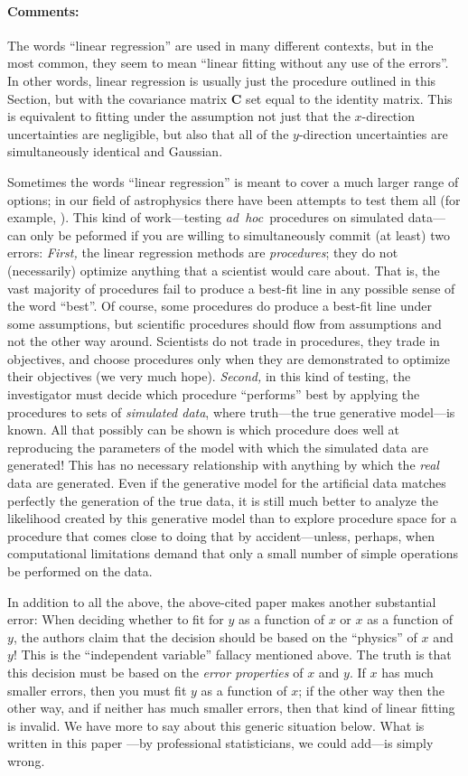 \documentclass[12pt,twoside]{article}
\newcommand{\notenglish}[1]{\textsl{#1}}
\newcommand{\adhoc}{\notenglish{ad~hoc}}
\newcommand{\sectionname}{Section}
\newcommand{\commentsname}{Comments}
\newenvironment{comments}{\paragraph{\commentsname:}}{}
\newcommand{\mmatrix}[1]{\boldsymbol{#1}}
\newcommand{\mC}{\mmatrix{C}}
\begin{document}
\begin{comments}
The words ``linear regression'' are used in many different contexts,
but in the most common, they seem to mean ``linear fitting without any
use of the errors''.  In other words, linear regression is usually
just the procedure outlined in this \sectionname, but with the
covariance matrix $\mC$ set equal to the identity matrix.  This is
equivalent to fitting under the assumption not just that the
$x$-direction uncertainties are negligible, but also that all of the
$y$-direction uncertainties are simultaneously identical and Gaussian.

Sometimes the words ``linear regression'' is meant to cover a much
larger range of options; in our field of astrophysics there have been
attempts to test them all (for example, \citealt{isobe90}).  This kind
of work---testing \adhoc\ procedures on simulated data---can only be
peformed if you are willing to simultaneously commit (at least) two
errors: \emph{First,} the linear regression methods are
\emph{procedures}; they do not (necessarily) optimize anything that a
scientist would care about. That is, the vast majority of procedures
fail to produce a best-fit line in any possible sense of the word
``best''.  Of course, some procedures do produce a best-fit line under
some assumptions, but scientific procedures should flow from
assumptions and not the other way around.  Scientists do not trade in
procedures, they trade in objectives, and choose procedures only when
they are demonstrated to optimize their objectives (we very much
hope).  \emph{Second,} in this kind of testing, the investigator must
decide which procedure ``performs'' best by applying the procedures to
sets of \emph{simulated data}, where truth---the true generative
model---is known.  All that possibly can be shown is which procedure
does well at reproducing the parameters of the model with which the
simulated data are generated!  This has no necessary relationship with
anything by which the \emph{real} data are generated.  Even if the
generative model for the artificial data matches perfectly the
generation of the true data, it is still much better to analyze the
likelihood created by this generative model than to explore procedure
space for a procedure that comes close to doing that by
accident---unless, perhaps, when computational limitations demand that
only a small number of simple operations be performed on the data.

In addition to all the above, the above-cited paper \citep{isobe90}
makes another substantial error: When deciding whether to fit for $y$
as a function of $x$ or $x$ as a function of $y$, the authors claim
that the decision should be based on the ``physics'' of $x$ and $y$!
This is the ``independent variable'' fallacy mentioned above.  The
truth is that this decision must be based on the \emph{error
properties} of $x$ and $y$. If $x$ has much smaller errors, then you
must fit $y$ as a function of $x$; if the other way then the other
way, and if neither has much smaller errors, then that kind of linear
fitting is invalid.  We have more to say about this generic situation
below.  What is written in this paper \citep{isobe90}---by
professional statisticians, we could add---is simply wrong.
\end{comments}
\end{document}
